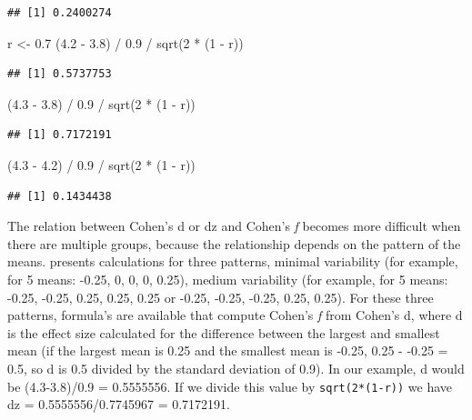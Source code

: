 \documentclass[
]{book}
\newenvironment{Shaded}{\begin{snugshade}}{\end{snugshade}}
\newcommand{\DecValTok}[1]{\textcolor[rgb]{0.00,0.00,0.81}{#1}}
\newcommand{\FloatTok}[1]{\textcolor[rgb]{0.00,0.00,0.81}{#1}}
\newcommand{\FunctionTok}[1]{\textcolor[rgb]{0.00,0.00,0.00}{#1}}
\newcommand{\NormalTok}[1]{#1}
\newcommand{\OtherTok}[1]{\textcolor[rgb]{0.56,0.35,0.01}{#1}}
\newcommand{\SpecialCharTok}[1]{\textcolor[rgb]{0.00,0.00,0.00}{#1}}
\begin{document}
\begin{verbatim}
## [1] 0.2400274
\end{verbatim}

\begin{Shaded}
\begin{Highlighting}[]
\NormalTok{  r }\OtherTok{\textless{}{-}} \FloatTok{0.7}
\NormalTok{  (}\FloatTok{4.2} \SpecialCharTok{{-}} \FloatTok{3.8}\NormalTok{) }\SpecialCharTok{/} \FloatTok{0.9} \SpecialCharTok{/} \FunctionTok{sqrt}\NormalTok{(}\DecValTok{2} \SpecialCharTok{*}\NormalTok{ (}\DecValTok{1} \SpecialCharTok{{-}}\NormalTok{ r))}
\end{Highlighting}
\end{Shaded}

\begin{verbatim}
## [1] 0.5737753
\end{verbatim}

\begin{Shaded}
\begin{Highlighting}[]
\NormalTok{  (}\FloatTok{4.3} \SpecialCharTok{{-}} \FloatTok{3.8}\NormalTok{) }\SpecialCharTok{/} \FloatTok{0.9} \SpecialCharTok{/} \FunctionTok{sqrt}\NormalTok{(}\DecValTok{2} \SpecialCharTok{*}\NormalTok{ (}\DecValTok{1} \SpecialCharTok{{-}}\NormalTok{ r))}
\end{Highlighting}
\end{Shaded}

\begin{verbatim}
## [1] 0.7172191
\end{verbatim}

\begin{Shaded}
\begin{Highlighting}[]
\NormalTok{  (}\FloatTok{4.3} \SpecialCharTok{{-}} \FloatTok{4.2}\NormalTok{) }\SpecialCharTok{/} \FloatTok{0.9} \SpecialCharTok{/} \FunctionTok{sqrt}\NormalTok{(}\DecValTok{2} \SpecialCharTok{*}\NormalTok{ (}\DecValTok{1} \SpecialCharTok{{-}}\NormalTok{ r))}
\end{Highlighting}
\end{Shaded}

\begin{verbatim}
## [1] 0.1434438
\end{verbatim}

The relation between Cohen's d or dz and Cohen's \emph{f} becomes more difficult when there are multiple groups, because the relationship depends on the pattern of the means. \citet{cohen1988spa} presents calculations for three patterns, minimal variability (for example, for 5 means: -0.25, 0, 0, 0, 0.25), medium variability (for example, for 5 means: -0.25, -0.25, 0.25, 0.25, 0.25 or -0.25, -0.25, -0.25, 0.25, 0.25). For these three patterns, formula's are available that compute Cohen's \emph{f} from Cohen's d, where d is the effect size calculated for the difference between the largest and smallest mean (if the largest mean is 0.25 and the smallest mean is -0.25, 0.25 - -0.25 = 0.5, so d is 0.5 divided by the standard deviation of 0.9). In our example, d would be (4.3-3.8)/0.9 = 0.5555556. If we divide this value by \texttt{sqrt(2*(1-r))} we have dz = 0.5555556/0.7745967 = 0.7172191.
\end{document}
